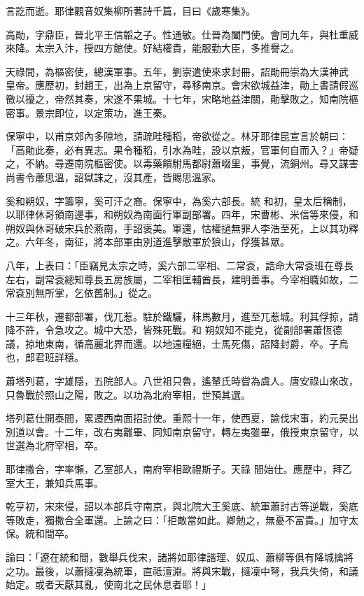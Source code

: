 \begin{pinyinscope}
 言訖而逝。耶律觀音奴集柳所著詩千篇，目曰《歲寒集》。



 高勛，字鼎臣，晉北平王信韜之子。性通敏。仕晉為闔門使。會同九年，與杜重威來降。太宗入汴，授四方館使。好結權貴，能服勤大臣，多推譽之。



 天祿間，為樞密使，總漢軍事。五年，劉崇遣使來求封冊，詔勛冊崇為大漢神武
 皇帝。應歷初，封趙王，出為上京留守，尋移南京。會宋欲城益津，勛上書請假巡徼以擾之，帝然其奏，宋遂不果城。十七年，宋略地益津關，勛擊敗之，知南院樞密事。景宗即位，以定策功，進王秦。



 保寧中，以甫京郊內多隙地，請疏畦種稻，帝欲從之。林牙耶律昆宣言於朝曰：「高勛此奏，必有異志。果令種稻，引水為畦，設以京叛，官軍何自而入？」帝疑之，不納。尋遷南院樞密使。以毒藥饋駙馬都尉蕭啜里，事覺，流銅州。尋又謀害尚書令蕭思溫，詔獄誅之，沒其產，皆賜思溫家。



 奚和朔奴，字籌寧，奚可汗之裔。保寧中，為奚六部長。統
 和初，皇太后稱制，以耶律休哥領南邊事，和朔奴為南面行軍副部署。四年，宋曹彬、米信等來侵，和朔奴與休哥破宋兵於燕南，手詔褒美。軍還，怙權撾無罪人李浩至死，上以其功釋之。六年冬，南征，將本部軍由別道進擊敵軍於狼山，俘獲甚眾。



 八年，上表曰：「臣竊見太宗之時，奚六部二宰相、二常袞，誥命大常袞班在尊長左右，副常袞總知尊長五房族屬，二宰相匡輔酋長，建明善事。今宰相職如故，二常袞別無所掌，乞依舊制。」從之。



 十三年秋，遷都部署，伐兀惹。駐於鐵驪，秣馬數月，進至兀惹城。利其俘掠，請降不許，令急攻之。城中大恐，皆殊死戰。和
 朔奴知不能克，從副部署蕭恆德議，掠地東南，循高麗北界而還。以地遠糧絕，士馬死傷，詔降封爵，卒。子烏也，郎君班詳穩。



 蕭塔列葛，字雄隱，五院部人。八世祖只魯，遙輦氏時嘗為虞人。唐安祿山來改，只魯戰於照山之陽，敗之。以功為北府宰相，世預其選。



 塔列葛仕開泰間，累遷西南面招討使。重熙十一年，使西夏，諭伐宋事，約元昊出別道以會。十二年，改右夷離畢、同知南京留守，轉左夷雖畢，俄授東京留守，以世選為北府宰相，卒。



 耶律撒合，字率懶，乙室部人，南府宰相歐禮斯子。天祿
 間始仕。應歷中，拜乙室大王，兼知兵馬事。



 乾亨初，宋來侵，詔以本部兵守南京，與北院大王奚底、統軍蕭討古等逆戰，奚底等敗走，獨撒合全軍還。上諭之曰：「拒敵當如此。卿勉之，無憂不富貴。」加守太保。統和間卒。



 論曰：「遼在統和間，數舉兵伐宋，諸將如耶律諧理、奴瓜、蕭柳等俱有降城擒將之功。最後，以蕭撻凜為統軍，直祗澶淵。將與宋戰，撻凜中弩，我兵失倚，和議始定。或者天厭其亂，使南北之民休息者耶！」



\end{pinyinscope}